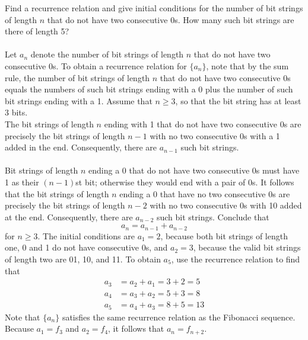 \documentclass[12pt]{article}
\begin{document}
\begin{example} Find a recurrence relation and give initial conditions for the number of bit strings of length $n$ that do not have two consecutive 0s. How many such bit strings are there of length 5? \\~\\ 
Let $a_n$ denote the number of bit strings of length $n$ that do not have two consecutive 0s. To obtain a recurrence relation for $\{a_n\}$, note that by the sum rule, the number of bit strings of length $n$ that do not have two consecutive 0s equals the numbers of such bit strings ending with a 0 plus the number of such bit strings ending with a 1. Assume that $n \geq 3$, so that the bit string has at least 3 bits. \\
The bit strings of length $n$ ending with 1 that do not have two consecutive 0s are precisely the bit strings of length $n - 1$ with no two consecutive 0s with a 1 added in the end. Consequently, there are $a_{n - 1}$ such bit strings. \\~\\ Bit strings of length $n$ ending a 0 that do not have two consecutive 0s must have 1 as their $(n - 1)$st bit; otherwise they would end with a pair of 0s. It follows that the bit strings of length $n$ ending a 0 that have no two consecutive 0s are precisely the bit strings of length $n - 2$ with no two consecutive 0s with 10 added at the end. Consequently, there are $a_{n - 2}$ such bit strings. Conclude that $$a_n = a_{n - 1} + a_{n - 2} $$ for $n \geq 3$. The initial conditions are $a_1 = 2$, because both bit strings of length one, 0 and 1 do not have consecutive 0s, and $a_2 = 3$, because the valid bit strings of length two are 01, 10, and 11. To obtain $a_5$, use the recurrence relation to find that $$\begin{aligned} a_3 &= a_ 2 + a_1 = 3 + 2 = 5 \\ a_4 &= a_3 + a_2 = 5 + 3 = 8 \\ a_5 &= a_4 + a_3 = 8 + 5 = 13 \end{aligned} $$ Note that $\{a_n\}$ satisfies the same recurrence relation as the Fibonacci sequence. Because $a_1 = f_3$ and $a_2 = f_4$, it follows that $a_n = f_{n + 2}$. \end{example} 
\end{document}
